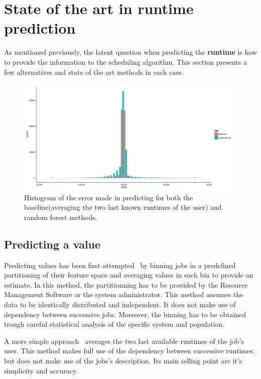 \documentclass{article}
\begin{document}
\section{State of the art in \textbf{runtime} prediction}

As mentioned previously, the latent question when predicting the \textbf{runtime} is how to provide the information to the scheduling algorithm. This section presents a few alternatives and state of the art methods in each case.

\begin{figure}[b]
  \centering
  \includegraphics[width=\textwidth]{../../truc.png}
  \caption{Histogram of the error made in predicting for both the baseline(averaging the two last known runtimes of the user) and random forest methods.}
  \label{fig:ratio}
\end{figure}


\subsection{Predicting a value}
\label{sub:predicting_a_value}

Predicting values has been first attempted~\cite{gibbons} by binning jobs in a predefined partitioning of their feature space and averaging values in each bin to provide an estimate. In this method, the partitionning has to be provided by the Resource Management Software or the system administrator. This method assumes the data to be identically distributed and independent. It does not make use of dependency between successive jobs. Moreover, the binning has to be obtained trough careful statistical analysis of the specific system and population.

A more simple approach~\cite{tsafir} averages the two last available runtimes of the job's user.
This method makes full use of the dependency between successive runtimes, but does not make use of the jobs's description. Its main selling point are it's simplicity and accuracy.
\end{document}
